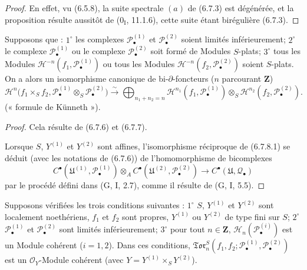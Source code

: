 \begin{proof}
En effet, vu (6.5.8), la suite spectrale $(a)$ de (6.7.3) est dégénérée, et
la proposition résulte aussitôt de ($0_{\mathrm I}$, 11.1.6), cette suite
étant birégulière (6.7.3).
\end{proof}

\begin{theorem}[6.7.8]
Supposons que : $1^\circ$ les complexes $\mathscr P_\bullet^{(1)}$ et
$\mathscr P_\bullet^{(2)}$ soient limités inférieurement; $2^\circ$ le
complexe $\mathscr P_\bullet^{(1)}$ ou le complexe
$\mathscr P_\bullet^{(2)}$ soit formé de Modules $S$-plats; $3^\circ$ tous les
Modules $\mathscr H^{-n}(f_1,\mathscr P_\bullet^{(1)})$ ou tous les Modules
$\mathscr H^{-n}(f_2,\mathscr P_\bullet^{(2)})$ soient $S$-plats. On a alors un
isomorphisme canonique de bi-$\partial$-foncteurs ($n$ parcourant $\mathbf Z$)
\[
  \mathscr H^n\bigl(f_1\times_S f_2,
    \mathscr P_\bullet^{(1)}\otimes_S\mathscr P_\bullet^{(2)}\bigr)
  \xrightarrow{\sim}
  \bigoplus_{n_1+n_2=n}
  \mathscr H^{n_1}(f_1,\mathscr P_\bullet^{(1)})
  \otimes_S
  \mathscr H^{n_2}(f_2,\mathscr P_\bullet^{(2)}).
  \tag{6.7.8.1}\label{III.6.7.8.1.fr}
\]
(« formule de Künneth »).
\end{theorem}

\begin{proof}
Cela résulte de (6.7.6) et (6.7.7).

Lorsque $S$, $Y^{(1)}$ et $Y^{(2)}$ sont affines, l'isomorphisme réciproque de
(6.7.8.1) se déduit (avec les notations de (6.7.6)) de l'homomorphisme de
bicomplexes
\[
  C^\bullet(\mathfrak U^{(1)},\mathscr P_\bullet^{(1)})
  \otimes_A
  C^\bullet(\mathfrak U^{(2)},\mathscr P_\bullet^{(2)})
  \longrightarrow
  C^\bullet(\mathfrak U,\mathscr Q_\bullet)
\]
par le procédé défini dans (G, I, 2.7), comme il résulte de (G, I, 5.5).
\end{proof}

\begin{proposition}[6.7.9]
Supposons vérifiées les trois conditions suivantes : $1^\circ$ $S$,
$Y^{(1)}$ et $Y^{(2)}$ sont localement noethériens, $f_1$ et $f_2$ sont
propres, $Y^{(1)}$ ou $Y^{(2)}$ de type fini sur $S$; $2^\circ$
$\mathscr P_\bullet^{(1)}$ et $\mathscr P_\bullet^{(2)}$ sont limités
inférieurement; $3^\circ$ pour tout $n\in\mathbf Z$,
$\mathscr H_n(\mathscr P_\bullet^{(i)})$ est un Module cohérent ($i=1,2$).
Dans ces conditions,
$\mathfrak{Tor}_n^S
(f_1,f_2;\mathscr P_\bullet^{(1)},\mathscr P_\bullet^{(2)})$ est un
$\mathscr O_Y$-Module cohérent (avec
$Y=Y^{(1)}\times_S Y^{(2)}$).
\end{proposition}

